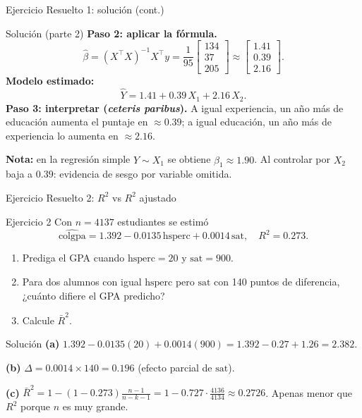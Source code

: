 \documentclass{beamer}
\begin{document}
\begin{frame}{Ejercicio Resuelto 1: solución (cont.)}

\begin{exampleblock}{Solución (parte 2)}
\textbf{Paso 2: aplicar la fórmula.}
\[
\hat{\beta} = (X^{\top}X)^{-1}X^{\top}y = \frac{1}{95}\begin{bmatrix}134\\37\\205\end{bmatrix}
\approx \begin{bmatrix} 1.41 \\ 0.39 \\ 2.16 \end{bmatrix}.
\]
\textbf{Modelo estimado:}
\[
\hat{Y} = 1.41 + 0.39\,X_1 + 2.16\,X_2.
\]
\textbf{Paso 3: interpretar (\emph{ceteris paribus}).} A igual experiencia, un año más de educación aumenta el puntaje en $\approx 0.39$; a igual educación, un año más de experiencia lo aumenta en $\approx 2.16$.

\medskip
\textbf{Nota:} en la regresión simple $Y\sim X_1$ se obtiene $\hat{\beta}_1\approx 1.90$. Al controlar por $X_2$ baja a $0.39$: evidencia de sesgo por variable omitida.
\end{exampleblock}

\end{frame}

\begin{frame}{Ejercicio Resuelto 2: $R^2$ vs $R^2$ ajustado}

\begin{block}{Ejercicio 2}
Con $n=4137$ estudiantes se estimó
\[
\widehat{\text{colgpa}} = 1.392 - 0.0135\,\text{hsperc} + 0.0014\,\text{sat}, \quad R^2 = 0.273.
\]
\begin{enumerate}
    \item[(a)] Prediga el GPA cuando $\text{hsperc}=20$ y $\text{sat}=900$.
    \item[(b)] Para dos alumnos con igual $\text{hsperc}$ pero $\text{sat}$ con 140 puntos de diferencia, ¿cuánto difiere el GPA predicho?
    \item[(c)] Calcule $\bar{R}^2$.
\end{enumerate}
\end{block}

\pause

\begin{exampleblock}{Solución}
\textbf{(a)} $1.392 - 0.0135(20) + 0.0014(900) = 1.392 - 0.27 + 1.26 = \mathbf{2.382}$.

\textbf{(b)} $\Delta = 0.0014 \times 140 = \mathbf{0.196}$ (efecto parcial de $\text{sat}$).

\textbf{(c)} $\displaystyle \bar{R}^2 = 1-(1-0.273)\frac{n-1}{n-k-1} = 1 - 0.727\cdot\frac{4136}{4134} \approx \mathbf{0.2726}$. Apenas menor que $R^2$ porque $n$ es muy grande.
\end{exampleblock}

\end{frame}
\end{document}

